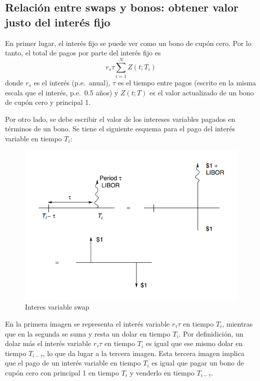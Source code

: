\subsection{Relación entre swaps y bonos: obtener valor justo del interés fijo}
En primer lugar, el interés fijo se puede ver como un bono de cupón cero. Por lo tanto, el total de pagos por parte del interés fijo es
\[
    r_s\tau \sum_{i=1}^N Z(t;T_i)
\]
donde $r_s$ es el interés (p.e.\ anual), $\tau$ es el tiempo entre pagos (escrito en la misma escala que el interés, p.e.\ 0.5 años) y $Z(t;T)$ es el valor actualizado de un bono de cupón cero y principal 1.

Por otro lado, se debe escribir el valor de los intereses variables pagados en términos de un bono. Se tiene el siguiente esquema para el pago del interés variable en tiempo $T_i$:
 \begin{figure}[H]
    \centering
    \includegraphics[width=0.65\linewidth]{Imagenes/Parte1/12_swaps/Relacion_Swaps_Bonos.png}
    \caption{Interes variable swap}
\end{figure}
En la primera imagen se representa el interés variable $r_\tau \tau$ en tiempo $T_i$, mientras que en la segunda se suma y resta un dolar en tiempo $T_i$. Por definidición, un dolar más el interés variable $r_\tau \tau$ en tiempo $T_i$ es igual que ese mismo dolar en tiempo $T_{i-\tau}$, lo que da lugar a la tercera imagen. Esta tercera imagen implica que el pago de un interés variable en tiempo $T_i$ es igual que pagar un bono de cupón cero con principal 1 en tiempo $T_i$ y venderlo en tiempo $T_{i-\tau}$.

